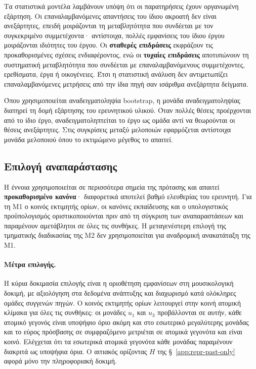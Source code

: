 \documentclass[11pt,a4paper]{article}
\begin{document}
Τα στατιστικά μοντέλα λαμβάνουν υπόψη ότι οι παρατηρήσεις έχουν οργανωμένη εξάρτηση. Οι επαναλαμβανόμενες απαντήσεις του ίδιου ακροατή δεν είναι ανεξάρτητες, επειδή μοιράζονται τη μεταβλητότητα που συνδέεται με τον συγκεκριμένο συμμετέχοντα· αντίστοιχα, πολλές εμφανίσεις του ίδιου έργου μοιράζονται ιδιότητες του έργου. Οι \textbf{σταθερές επιδράσεις} εκφράζουν τις προκαθορισμένες σχέσεις ενδιαφέροντος, ενώ οι \textbf{τυχαίες επιδράσεις} αποτυπώνουν τη συστηματική μεταβλητότητα που συνδέεται με επαναλαμβανόμενους συμμετέχοντες, ερεθίσματα, έργα ή οικογένειες. Έτσι η στατιστική ανάλυση δεν αντιμετωπίζει επαναλαμβανόμενες μετρήσεις από την ίδια πηγή σαν ισάριθμα ανεξάρτητα δείγματα.

Όπου χρησιμοποιείται αναδειγματοληψία bootstrap, η μονάδα αναδειγματοληψίας διατηρεί τη δομή εξάρτησης του ερευνητικού υλικού. Όταν πολλές θέσεις προέρχονται από το ίδιο έργο, αναδειγματοληπτείται το έργο ως ομάδα αντί να θεωρούνται οι θέσεις ανεξάρτητες. Στις συγκρίσεις μεταξύ μελοποιών εφαρμόζεται αντίστοιχα μονάδα μελοποιού όπου το εκτιμώμενο μέγεθος το απαιτεί.

\subsection{Επιλογή αναπαράστασης}\label{app:stats-selection}

Η έννοια χρησιμοποιείται σε περισσότερα σημεία της πρότασης και απαιτεί \textbf{προκαθορισμένο κανόνα}· διαφορετικά αποτελεί βαθμό ελευθερίας του ερευνητή. Για τη M1 ο κοινός εκτιμητής ορίων, οι κανόνες εκπαίδευσης και ο υπολογιστικός προϋπολογισμός οριστικοποιούνται πριν από τη σύγκριση των αναπαραστάσεων και παραμένουν αμετάβλητοι σε όλες τις συνθήκες. Η μεταγενέστερη επιλογή της τμηματικής διαδικασίας της M2 δεν χρησιμοποιείται για αναδρομική ανακατάταξη της M1.

\paragraph{Μέτρα επιλογής.}
Η κύρια δοκιμασία επιλογής είναι η οριοθέτηση εμφανίσεων στη μουσικολογική δοκιμή, με αξιολόγηση στα δεδομένα ανάπτυξης και διαχωρισμό κατά ολόκληρες ομάδες συγγενών πηγών. Ο κοινός εκτιμητής ορίων λειτουργεί στην κοινή ατομική κλίμακα για όλες τις συνθήκες: οι μονάδες \(u_1\) και \(u_3\) προβάλλονται σε αυτήν, κάθε ατομικό γεγονός είναι υποψήφιο όριο ακόμη και στο εσωτερικό μεγαλύτερης μονάδας και το εύρος πρόσβασης σε συμφραζόμενο μετριέται σε ατομικά γεγονότα και είναι κοινό. Ελέγχεται ότι τα εσωτερικά ατομικά γεγονότα κάθε μονάδας παραμένουν διακριτά ως υποψήφια όρια. Ο αιτιακός ορίζοντας \(H\) της §~\ref{app:repr-past-only} αφορά μόνο την πληροφοριακή δοκιμή.
\end{document}
